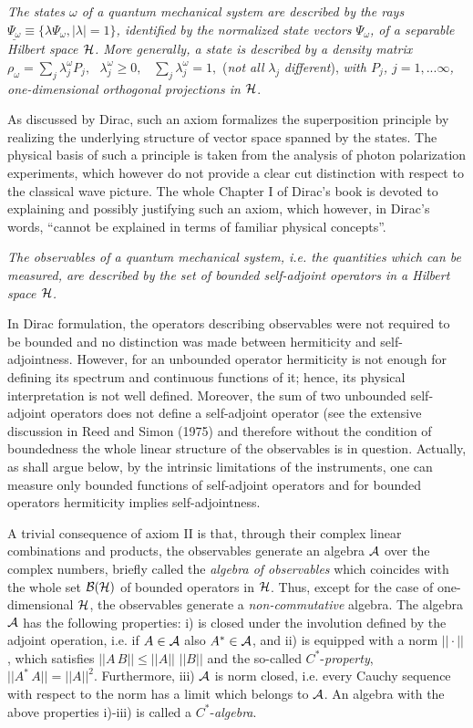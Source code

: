 \documentclass[12pt]{article}
\def \eqq {\equiv}
\def \l {{\lambda}}
\def \om {{\omega}}
\def \A {{\cal A}}
\def \B {{\cal B}}
\def \H {\mbox{${\cal H}$}}
\begin{document}
\vspace{1mm}  {\em The states $\omega  $ of a quantum mechanical system are described by the  rays  $ \underline{\Psi_\om} \eqq \{ \l \Psi_\om, |\l| = 1\}$, identified by  the normalized state vectors $\Psi_\om$,  of a separable Hilbert space
 $\H$.  
More  generally,  a state is described by a density matrix}  $\rho_\om = \sum_j \l^\om_j P_j,\,\,\,\,\l^\om_j \geq 0, \,\,\,\,\,\sum_j \l^\om_j = 1,$ ({\em not all} $\lambda_j$ {\em different}), {\em with $P_j$, $j = 1, ...\infty$, one-dimensional  orthogonal projections in $\H$}. 

As discussed by Dirac, such an axiom  formalizes the {superposition principle} by realizing the underlying structure of vector space spanned by the states. 
The physical basis of such a principle is taken from the analysis of photon polarization experiments, which however do not provide a clear cut distinction with respect to the classical wave picture. The whole Chapter I of Dirac's book is devoted to explaining and possibly justifying such an axiom, which however, in Dirac's words, ``cannot be explained in terms of familiar physical concepts''. 

\vspace{1mm}  {\em The observables of a quantum mechanical system, i.e. the quantities which can be measured, are described by the set of bounded self-adjoint operators in a Hilbert space  $\H$.}

In Dirac formulation, the operators describing  observables were not required to be bounded and no distinction was made between hermiticity and self-adjointness. 
However,  for an unbounded operator hermiticity is not enough for defining its spectrum and continuous functions of it; hence, its physical interpretation is not well defined. Moreover, the sum of two unbounded self-adjoint operators does not define a self-adjoint operator (see the extensive discussion in Reed and Simon (1975) and therefore  without the condition of  boundedness the whole linear structure of the observables is in question. 
Actually, as shall  argue below, by the intrinsic  limitations of the instruments,   one can measure only bounded functions of self-adjoint operators and for bounded operators hermiticity implies self-adjointness.

A  trivial consequence of axiom II   is that,  through their complex linear combinations and products,  the observables generate an algebra $\A$ over the complex numbers, briefly called the {\em algebra of observables} which coincides with  the whole set $\B(\H)$ of  bounded operators in $\H$. Thus, except for the case of one-dimensional $\H$, the observables generate a {\em non-commutative} algebra. 
The algebra  $\A$ has the following properties:  i) is closed under the involution defined by the adjoint operation, i.e. if $A \in \A$ also $A^* \in \A$, and ii) is equipped with a norm $|| \cdot ||$,  which satisfies  $|| A\,B || \leq || A ||\,\,|| B ||$ and  the so-called $C^*$-{\em property}, 
$||A^* \,A|| = || A ||^2.$ Furthermore, iii) $\A$ is norm closed, i.e. every Cauchy sequence with respect to the norm has a limit which belongs to $\A$. 
An algebra with the above properties i)-iii) is called a  $C^*$-{\em algebra}.
\end{document}
